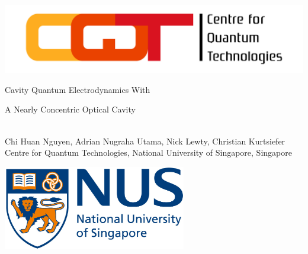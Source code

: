 \documentclass[portrait,a0,final]{a0poster} %
\newenvironment{poster}{
  \begin{center}
  \begin{minipage}[c]{0.98\textwidth}
}{
  \end{minipage} 
  \end{center}
}
\begin{document}

\begin{poster}
\large \sf
\vspace{2cm}
\begin{center}

      \begin{minipage}[c]{0.05\textwidth}
        \begin{center}
          \includegraphics[width=14cm,angle=0]{CQT_Logo_CMYK.jpg}
        \end{center}
      \end{minipage}\hspace{10cm}
      \begin{minipage}[c]{0.7\textwidth}
        \begin{center}
          {\sc \huge Cavity Quantum Electrodynamics With  \\ \vspace{0.8cm}
          
A Nearly Concentric Optical Cavity}\\[9mm]
          {\large Chi Huan Nguyen, Adrian Nugraha Utama, Nick Lewty, Christian Kurtsiefer}\\[6mm]
          Centre for Quantum Technologies, National University of Singapore, Singapore\\
          
        \end{center}
      \end{minipage}
      \begin{minipage}[l]{0.1\textwidth}
        \begin{center}
          \includegraphics[width=8cm,angle=0]{NUS_logo_full-horizontal.jpg}
        \end{center}
      \end{minipage}
\end{center}


\end{poster}
\end{document}
